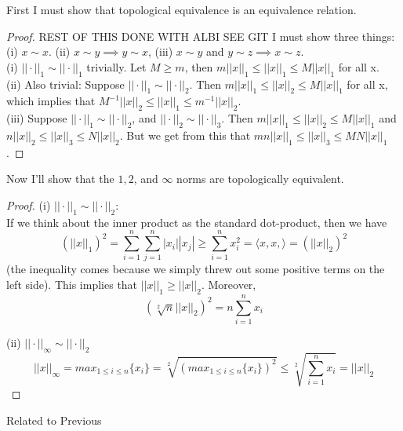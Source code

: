 \documentclass[12pt]{article}
\newenvironment{problem}[2][Problem]{\begin{trivlist}
\item[\hskip \labelsep {\bfseries #1}\hskip \labelsep {\bfseries #2.}]}{\end{trivlist}}
\theoremstyle{definition}
\theoremstyle{definition}
\theoremstyle{definition}
\theoremstyle{definition}
\begin{document}
\begin{problem}{3.26} 
First I must show that topological equivalence is an equivalence relation.
\begin{proof}
REST OF THIS DONE WITH ALBI SEE GIT
I must show three things: (i) $x \sim x$. (ii) $x \sim y  \implies y \sim x$, (iii) $x \sim y$ and $y \sim z \implies x \sim z$. \\
(i) $ || \cdot ||_1 \sim || \cdot ||_1 $ trivially. Let $M \geq m$, then $m||x||_1 \leq || x ||_1 \leq M|| x ||_1$ for all x. \\
(ii) Also trivial: Suppose $|| \cdot ||_1 \sim || \cdot ||_2$. Then $m||x||_1 \leq || x ||_2 \leq M|| x ||_1$ for all x, which implies that $M^{-1}||x||_2 \leq ||x||_1 \leq m^{-1}||x||_2$. \\
(iii) Suppose $|| \cdot ||_1 \sim || \cdot ||_2 $, and $|| \cdot ||_2 \sim || \cdot ||_3$. Then $m||x||_1 \leq || x ||_2 \leq M|| x ||_1$ and $n||x||_2 \leq || x ||_3 \leq N|| x ||_2$. But we get from this that $mn||x||_1 \leq ||x||_3 \leq MN||x||_1$.
\end{proof}
Now I'll show that the $1, 2$, and $ \infty$ norms are topologically equivalent. 
\begin{proof}
(i) $|| \cdot ||_1 \sim || \cdot ||_2$: \\
If we think about the inner product as the standard dot-product, then we have $$(||x||_1)^2 = \sum_{i=1}^n \sum_{j=1}^n |x_i||x_j| \geq \sum_{i=1}^n x_i^2 = \langle x, x, \rangle = (||x||_2)^2$$ 
(the inequality comes because we simply threw out some positive terms on the left side). This implies that $||x||_1 \geq ||x||_2$. Moreover,
$$
(\sqrt[2]{n} ||x||_2)^2 = n \sum_{i=1}^n x_i 
$$

(ii) $|| \cdot ||_\infty \sim || \cdot ||_2$\
$$
||x||_\infty = max_{1 \leq i \leq n}\{ x_i \} = \sqrt[2]{(max_{1 \leq i \leq n} \{ x_i \})^2} \leq \sqrt[2]{\sum_{i=1}^n x_i} = ||x||_2
$$
\end{proof}
\end{problem}

\begin{problem}{3.28}
Related to Previous
\end{problem}
\end{document}
